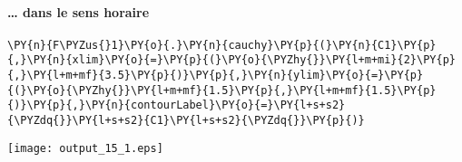\paragraph{\ldots{} dans le sens horaire\label{dans-le-sens-horaire}}
\begin{tcolorbox}[breakable, size=fbox, boxrule=1pt, pad at break*=1mm,colback=cellbackground, colframe=cellborder]
\begin{Verbatim}[commandchars=\\\{\}]
\PY{n}{F\PYZus{}1}\PY{o}{.}\PY{n}{cauchy}\PY{p}{(}\PY{n}{C1}\PY{p}{,}\PY{n}{xlim}\PY{o}{=}\PY{p}{(}\PY{o}{\PYZhy{}}\PY{l+m+mi}{2}\PY{p}{,}\PY{l+m+mf}{3.5}\PY{p}{)}\PY{p}{,}\PY{n}{ylim}\PY{o}{=}\PY{p}{(}\PY{o}{\PYZhy{}}\PY{l+m+mf}{1.5}\PY{p}{,}\PY{l+m+mf}{1.5}\PY{p}{)}\PY{p}{,}\PY{n}{contourLabel}\PY{o}{=}\PY{l+s+s2}{\PYZdq{}}\PY{l+s+s2}{C1}\PY{l+s+s2}{\PYZdq{}}\PY{p}{)}
\end{Verbatim}
\end{tcolorbox}
\begin{center}
    \texttt{[image: output\_15\_1.eps]}
\end{center}
